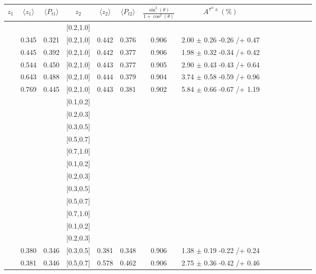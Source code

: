 \begin{table}[H]\scriptsize
\centering
\begin{tabular}{|c| c| c| c| c| c| c| c| c| c|c| c| c| c| c|}
\hline
$z_1$ & $\langle  z_1\rangle$ & $\langle  P_{t1} \rangle$ & $z_2$ & $\langle  z_2 \rangle$ & $\langle  P_{t2}  \rangle$& $\frac{\sin^2(\theta)}{1+\cos^2(\theta)}$ & $A^{\pi^0\pm}(\%)$  \\ \hline
[0.2,0.3]	&		&		&	[0.2,1.0]	&		&		&		&							\\ \hline
[0.3,0.4]	&	0.345	&	0.321	&	[0.2,1.0]	&	0.442	&	0.376	&	0.906	&	2.00	$\pm$	0.26	-0.26	/+	0.47	\\ \hline
[0.4,0.5]	&	0.445	&	0.392	&	[0.2,1.0]	&	0.442	&	0.377	&	0.906	&	1.98	$\pm$	0.32	-0.34	/+	0.42	\\ \hline
[0.5,0.6]	&	0.544	&	0.450	&	[0.2,1.0]	&	0.443	&	0.377	&	0.905	&	2.90	$\pm$	0.43	-0.43	/+	0.64	\\ \hline
[0.6,0.7]	&	0.643	&	0.488	&	[0.2,1.0]	&	0.444	&	0.379	&	0.904	&	3.74	$\pm$	0.58	-0.59	/+	0.96	\\ \hline
[0.7,1.0]	&	0.769	&	0.445	&	[0.2,1.0]	&	0.443	&	0.381	&	0.902	&	5.84	$\pm$	0.66	-0.67	/+	1.19	\\ \hline
[0.1,0.2]	&		&		&	[0.1,0.2]	&		&		&		&							\\ \hline
[0.1,0.2]	&		&		&	[0.2,0.3]	&		&		&		&		 					\\ \hline
[0.1,0.2]	&		&		&	[0.3,0.5]	&		&		&		&		 					\\ \hline
[0.1,0.2]	&		&		&	[0.5,0.7]	&		&		&		&		 					\\ \hline
[0.1,0.2]	&		&		&	[0.7,1.0]	&		&		&		&		 					\\ \hline
[0.2,0.3]	&		&		&	[0.1,0.2]	&		&		&		&		 					\\ \hline
[0.2,0.3]	&		&		&	[0.2,0.3]	&		&		&		&		 					\\ \hline
[0.2,0.3]	&		&		&	[0.3,0.5]	&		&		&		&		 					\\ \hline
[0.2,0.3]	&		&		&	[0.5,0.7]	&		&		&		&		 					\\ \hline
[0.2,0.3]	&		&		&	[0.7,1.0]	&		&		&		&		 					\\ \hline
[0.3,0.5]	&		&		&	[0.1,0.2]	&		&		&		&		 					\\ \hline
[0.3,0.5]	&		&		&	[0.2,0.3]	&		&		&		&		 					\\ \hline
[0.3,0.5]	&	0.380	&	0.346	&	[0.3,0.5]	&	0.381	&	0.348	&	0.906	&	1.38	$\pm$	0.19	-0.22	/+	0.24	\\ \hline
[0.3,0.5]	&	0.381	&	0.346	&	[0.5,0.7]	&	0.578	&	0.462	&	0.906	&	2.75	$\pm$	0.36	-0.42	/+	0.46	\\ \hline

\end{tabular}
\end{table}
